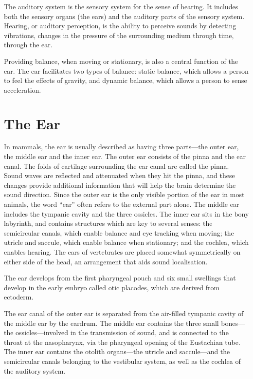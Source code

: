 The auditory system is the sensory system for the sense of hearing. It includes both the sensory organs (the ears) and the auditory parts of the sensory system. Hearing, or auditory perception, is the ability to perceive sounds by detecting vibrations, changes in the pressure of the surrounding medium through time, through the ear.

Providing balance, when moving or stationary, is also a central function of the ear. The ear facilitates two types of balance: static balance, which allows a person to feel the effects of gravity, and dynamic balance, which allows a person to sense acceleration.

\hypertarget{the-ear}{%
\section{The Ear}\label{the-ear}}

In mammals, the ear is usually described as having three parts---the outer ear, the middle ear and the inner ear. The outer ear consists of the pinna and the ear canal. The folds of cartilage surrounding the ear canal are called the pinna. Sound waves are reflected and attenuated when they hit the pinna, and these changes provide additional information that will help the brain determine the sound direction. Since the outer ear is the only visible portion of the ear in most animals, the word ``ear'' often refers to the external part alone. The middle ear includes the tympanic cavity and the three ossicles. The inner ear sits in the bony labyrinth, and contains structures which are key to several senses: the semicircular canals, which enable balance and eye tracking when moving; the utricle and saccule, which enable balance when stationary; and the cochlea, which enables hearing. The ears of vertebrates are placed somewhat symmetrically on either side of the head, an arrangement that aids sound localisation.

The ear develops from the first pharyngeal pouch and six small swellings that develop in the early embryo called otic placodes, which are derived from ectoderm.

The ear canal of the outer ear is separated from the air-filled tympanic cavity of the middle ear by the eardrum. The middle ear contains the three small bones---the ossicles---involved in the transmission of sound, and is connected to the throat at the nasopharynx, via the pharyngeal opening of the Eustachian tube. The inner ear contains the otolith organs---the utricle and saccule---and the semicircular canals belonging to the vestibular system, as well as the cochlea of the auditory system.

